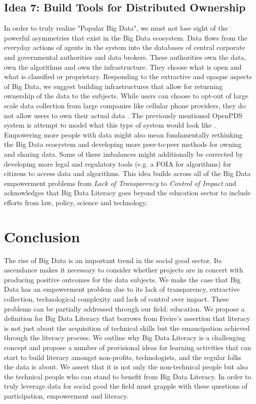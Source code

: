 \documentclass{sig-alternate}
\begin{document}
\subsection{Idea 7: Build Tools for Distributed Ownership}
In order to truly realize "Popular Big Data", we must not lose sight of the powerful asymmetries that exist in the Big Data ecosystem. Data flows from the everyday actions of agents in the system into the databases of central corporate and governmental authorities and data brokers. These authorities own the data, own the algorithms and own the infrastructure. They choose what is open and what is classified or proprietary. Responding to the extractive and opaque aspects of Big Data, we suggest building infrastructures that allow for returning ownership of the data to the subjects. While users can choose to opt-out of large scale data collection from large companies like cellular phone providers, they do not allow users to own their actual data \cite{leber_how_2013}. The previously mentioned OpenPDS system is attempt to model what this type of system would look like \cite{de_montjoye_openpds_2014}.  Empowering more people with data might also mean fundamentally rethinking the Big Data ecosystem and developing more peer-to-peer methods for owning and sharing data. Some of these imbalances might additionally be corrected by developing more legal and regulatory tools (e.g. a FOIA for algorithms) for citizens to access data and algorithms. This idea builds across all of the Big Data empowerment problems from \textit{Lack of Transparency} to \textit{Control of Impact} and acknowledges that Big Data Literacy goes beyond the education sector to include efforts from law, policy, science and technology.

\section{Conclusion}

The rise of Big Data is an important trend in the social good sector. Its ascendance makes it necessary to consider whether projects are in concert with producing positive outcomes for the data subjects. We make the case that Big Data has an empowerment problem due to its lack of transparency, extractive collection, technological complexity and lack of control over impact. These problems can be partially addressed through our field: education. We propose a definition for Big Data Literacy that borrows from Freire's assertion that literacy is not just about the acquisition of technical skills but the emancipation achieved through the literacy process. We outline why Big Data Literacy is a challenging concept and propose a number of provisional ideas for learning activities that can start to build literacy amongst non-profits, technologists, and the regular folks the data is about. We assert that it is not only the non-technical people but also the technical people who can stand to benefit from Big Data Literacy. In order to truly leverage data for social good the field must grapple with these questions of participation, empowerment and literacy.  




\end{document}
